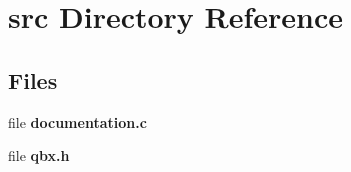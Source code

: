 \section{src Directory Reference}
\label{dir_68267d1309a1af8e8297ef4c3efbcdba}
\subsection*{Files}
\begin{DoxyCompactItemize}
\item 
file {\bfseries documentation.\+c}
\item 
file {\bfseries qbx.\+h}
\end{DoxyCompactItemize}
